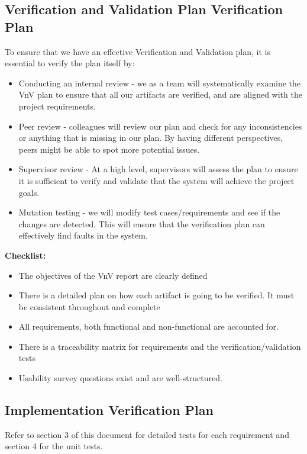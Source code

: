 \documentclass[12pt, titlepage]{article}
\begin{document}
\subsection{Verification and Validation Plan Verification Plan}

To ensure that we have an effective Verification and Validation plan, it is essential to verify the plan itself by:
\begin{itemize}
    \item Conducting an internal review - we as a team will systematically examine the VnV plan to ensure that all our artifacts are verified, and are aligned with the project requirements.
    \item Peer review -  colleagues will review our plan and check for any inconsistencies or anything that is missing in our plan. By having different perspectives, peers might be able to spot more potential issues.
    \item Supervisor review - At a high level, supervisors will assess the plan to ensure it is sufficient to verify and validate that the system will achieve the project goals.
    \item Mutation testing - we will modify test cases/requirements and see if the changes are detected. This will ensure that the verification plan can effectively find faults in the system.
\end{itemize}
\textbf{Checklist:}
\begin{itemize}
    \item The objectives of the VnV report are clearly defined
    \item There is a detailed plan on how each artifact is going to be verified. It must be consistent throughout and complete
    \item All requirements, both functional and non-functional are accounted for.
    \item There is a traceability matrix for requirements and the verification/validation tests
    \item Usability survey questions exist and are well-structured.
\end{itemize}

\subsection{Implementation Verification Plan}

Refer to section 3 of this document for detailed tests for each requirement and section 4 for the unit tests.
\end{document}
